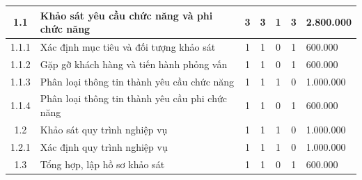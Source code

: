 \begin{longtable}{|c|p{3cm}|c|c|c|c|p{3cm}|}
    1.1                             & Khảo sát yêu cầu chức năng và phi chức năng                   & 3                                              & 3                                               & 1                                                               & 3                  & 2.800.000  \\ \hline
    1.1.1                           & Xác định mục tiêu và đối tượng khảo sát                       & 1                                              & 1                                               & 0                                                               & 1                  & 600.000    \\ \hline
    1.1.2                           & Gặp gỡ khách hàng và tiến hành phỏng vấn                      & 1                                              & 1                                               & 0                                                               & 1                  & 600.000    \\ \hline
    1.1.3                           & Phân loại thông tin thành yêu cầu chức năng                   & 1                                              & 1                                               & 1                                                               & 0                  & 1.000.000  \\ \hline
    1.1.4                           & Phân loại thông tin thành yêu cầu phi chức năng               & 1                                              & 1                                               & 0                                                               & 1                  & 600.000    \\ \hline
    1.2                             & Khảo sát quy trình nghiệp vụ                                  & 1                                              & 1                                               & 1                                                               & 0                  & 1.000.000  \\ \hline
    1.2.1                           & Xác định quy trình nghiệp vụ                                  & 1                                              & 1                                               & 1                                                               & 0                  & 1.000.000  \\ \hline
    1.3                             & Tổng hợp, lập hồ sơ khảo sát                                  & 1                                              & 1                                               & 0                                                               & 1                  & 600.000    \\ \hline

\end{longtable}
